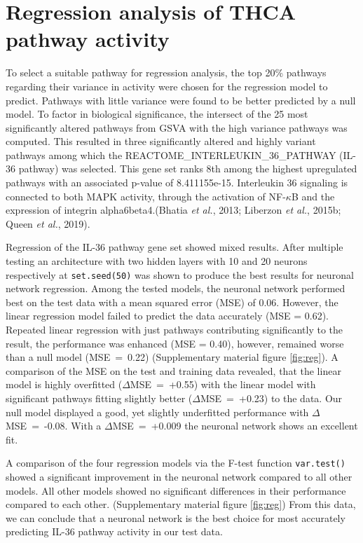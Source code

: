 \documentclass[
  11pt,
  parskip,
  oneside]{scrreprt}
\begin{document}
\hypertarget{regression-analysis-of-thca-pathway-activity}{%
\section{Regression analysis of THCA pathway
activity}\label{regression-analysis-of-thca-pathway-activity}}

To select a suitable pathway for regression analysis, the top 20\%
pathways regarding their variance in activity were chosen for the
regression model to predict. Pathways with little variance were found to
be better predicted by a null model. To factor in biological
significance, the intersect of the 25 most significantly altered
pathways from GSVA with the high variance pathways was computed. This
resulted in three significantly altered and highly variant pathways
among which the REACTOME\_INTERLEUKIN\_36\_PATHWAY (IL-36 pathway) was
selected. This gene set ranks 8th among the highest upregulated pathways
with an associated p-value of 8.411155e-15. Interleukin 36 signaling is
connected to both MAPK activity, through the activation of
NF-\(\kappa\)B and the expression of integrin alpha6beta4.(Bhatia
\emph{et al.}, 2013; Liberzon \emph{et al.}, 2015b; Queen \emph{et al.},
2019).

Regression of the IL-36 pathway gene set showed mixed results. After
multiple testing an architecture with two hidden layers with 10 and 20
neurons respectively at \texttt{set.seed(50)} was shown to produce the
best results for neuronal network regression. Among the tested models,
the neuronal network performed best on the test data with a mean squared
error (MSE) of 0.06. However, the linear regression model failed to
predict the data accurately (MSE = 0.62). Repeated linear regression
with just pathways contributing significantly to the result, the
performance was enhanced (MSE = 0.40), however, remained worse than a
null model (MSE~=~0.22) (Supplementary material figure \ref{fig:reg}). A
comparison of the MSE on the test and training data revealed, that the
linear model is highly overfitted (\(\Delta\)MSE~=~+0.55) with the
linear model with significant pathways fitting slightly better
(\(\Delta\)MSE~=~+0.23) to the data. Our null model displayed a good,
yet slightly underfitted performance with \(\Delta\)MSE~=~-0.08. With a
\(\Delta\)MSE~=~+0.009 the neuronal network shows an excellent fit.

A comparison of the four regression models via the F-test function
\texttt{var.test()} showed a significant improvement in the neuronal
network compared to all other models. All other models showed no
significant differences in their performance compared to each other.
(Supplementary material figure \ref{fig:reg}) From this data, we can
conclude that a neuronal network is the best choice for most accurately
predicting IL-36 pathway activity in our test data.
\end{document}
